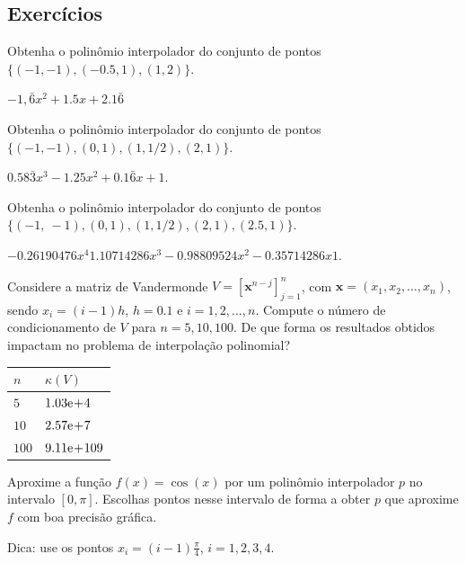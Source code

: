 \subsection{Exercícios}

\begin{exer}
  Obtenha o polinômio interpolador do conjunto de pontos $\{(-1, -1), (-0.5, 1), (1, 2)\}$.
\end{exer}
\begin{resp}
  $-1,\bar{6}x^2 + 1.5x + 2.1\bar{6}$
\end{resp}

\begin{exer}
  Obtenha o polinômio interpolador do conjunto de pontos $\{(-1, -1), (0, 1), (1, 1/2), (2, 1)\}$.
\end{exer}
\begin{resp}
  $0.58\bar{3}x^3 - 1.25x^2 + 0.1\bar{6}x + 1$. 
\end{resp}

\begin{exer}
  Obtenha o polinômio interpolador do conjunto de pontos $\{(-1,~-1), (0, 1), (1, 1/2), (2, 1), (2.5, 1)\}$.
\end{exer}
\begin{resp}
  $-0.26190476x^4  1.10714286x^3 -0.98809524x^2 -0.35714286x  1$.  
\end{resp}

\begin{exer}
  Considere a matriz de Vandermonde $V = [\pmb{x}^{n-j}]_{j=1}^{n}$, com $\pmb{x} = (x_1, x_2, \dotsc, x_n)$, sendo $x_i = (i-1)h$, $h=0.1$ e $i = 1, 2, \dotsc, n$. Compute o número de condicionamento de $V$ para $n=5, 10, 100$. De que forma os resultados obtidos impactam no problema de interpolação polinomial?
\end{exer}
\begin{resp}
  \begin{tabular}{ll}
    $n$ & $\kappa(V)$\\\hline
    $5$ & $1.03\mathrm{e}\!+\!4$\\
    $10$ & $2.57\mathrm{e}\!+\!7$\\
    $100$ & $9.11\mathrm{e}\!+\!109$\\\hline
  \end{tabular}
\end{resp}

\begin{exer}
  Aproxime a função $f(x) = \cos(x)$ por um polinômio interpolador $p$ no intervalo $[0, \pi]$. Escolhas pontos nesse intervalo de forma a obter $p$ que aproxime $f$ com boa precisão gráfica.
\end{exer}
\begin{resp}
  Dica: use os pontos $x_i = (i-1)\frac{\pi}{4}$, $i = 1, 2, 3, 4$.
\end{resp}

